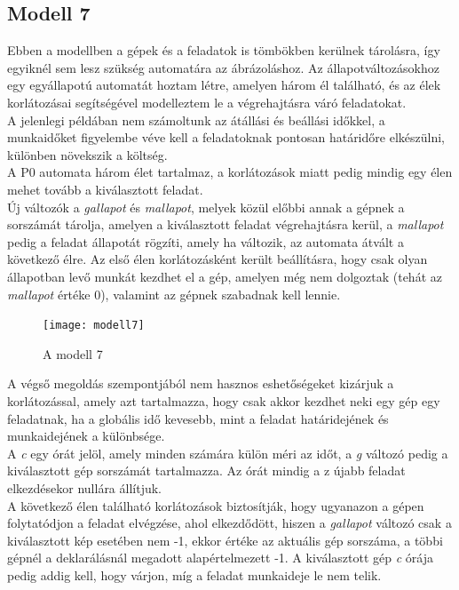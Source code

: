 \documentclass {report}
\begin{document}
\subsection{Modell 7}
Ebben a modellben a gépek és a feladatok is tömbökben kerülnek tárolásra, így egyiknél sem lesz szükség automatára az ábrázoláshoz. Az állapotváltozásokhoz egy egyállapotú automatát hoztam létre, amelyen három él található, és az élek korlátozásai segítségével modelleztem le a végrehajtásra váró feladatokat. \\
A jelenlegi példában nem számoltunk az átállási és beállási időkkel, a munkaidőket figyelembe véve kell a feladatoknak pontosan határidőre elkészülni, különben növekszik a költség.\\
A P0 automata három élet tartalmaz, a korlátozások miatt pedig mindig egy élen mehet tovább a kiválasztott feladat.\\
Új változók a \emph{gallapot} és \emph{mallapot}, melyek közül előbbi annak a gépnek a sorszámát tárolja, amelyen a kiválasztott feladat végrehajtásra kerül, a \emph{mallapot} pedig a feladat állapotát rögzíti, amely ha változik, az automata átvált a következő élre. Az első élen korlátozásként került beállításra, hogy csak olyan állapotban levő munkát kezdhet el a gép, amelyen még nem dolgoztak (tehát az \emph{mallapot} értéke 0), valamint az gépnek szabadnak kell lennie.\\
\begin{figure}[htpb]
\begin{center}
\texttt{[image: modell7]}
\caption{A modell 7}
\end{center}
\end{figure}
A végső megoldás szempontjából nem hasznos eshetőségeket kizárjuk a korlátozással, amely azt tartalmazza, hogy csak akkor kezdhet neki egy gép egy feladatnak, ha a globális idő kevesebb, mint a feladat határidejének és munkaidejének a különbsége. \\
A \emph{c} egy órát jelöl, amely minden számára külön méri az időt, a \emph{g} változó pedig a kiválasztott gép sorszámát tartalmazza. Az órát mindig a z újabb feladat elkezdésekor nullára állítjuk.\\
A  következő élen található korlátozások biztosítják, hogy ugyanazon a gépen folytatódjon a feladat elvégzése, ahol elkezdődött, hiszen a \emph{gallapot} változó csak a kiválasztott kép esetében nem -1, ekkor értéke az aktuális gép sorszáma, a többi gépnél a deklarálásnál megadott alapértelmezett -1. A kiválasztott gép \emph{c} órája pedig addig kell, hogy várjon, míg a feladat munkaideje le nem telik. \\
\end{document}
